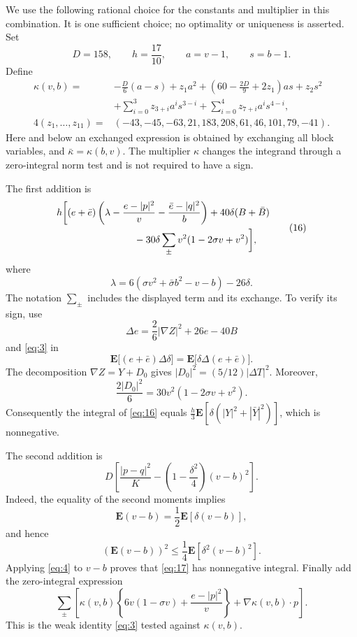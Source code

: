 We use the following rational choice for the constants and
multiplier in this combination. It is one
sufficient choice; no optimality or uniqueness is asserted.
Set
\[
 D=158,\qquad h=\frac{17}{10},\qquad
 a=v-1,\qquad s=b-1.
\]
Define
\begin{equation}
\begin{aligned}
 \kappa(v,b)={}&-\frac D6(a-s)+z_1a^2
       +\left(60-\frac{2D}{9}+2z_1\right)as+z_2s^2\\
 &+\sum_{i=0}^3z_{3+i}a^is^{3-i}
       +\sum_{i=0}^4z_{7+i}a^is^{4-i},\\
 4(z_1,\ldots,z_{11})={}&
       (-43,-45,-63,21,183,208,61,46,101,79,-41).
\end{aligned}
\tag{15}\label{eq:15}
\end{equation}
Here and below an exchanged expression is obtained by exchanging all
block variables, and $\bar\kappa=\kappa(b,v)$.
The multiplier $\kappa$ changes the integrand through a zero-integral
norm test and is not required to have a sign.

The first addition is
\begin{equation}
\begin{aligned}
 h\bigg[&(e+\bar e)
   \left(\lambda-\frac{e-|p|^2}{v}
                     -\frac{\bar e-|q|^2}{b}\right)
       +40\delta(B+\bar B)\\
 &\hspace{24mm}
       -30\delta\sum_{\pm}v^2(1-2\sigma v+v^2)\bigg],
\end{aligned}
\tag{16}\label{eq:16}
\end{equation}
where
\[
 \lambda=6(\sigma v^2+\bar\sigma b^2-v-b)-26\delta.
\]
The notation $\sum_\pm$ includes the displayed term and its exchange.
To verify its sign, use
\[
 \Delta e=\frac{2}{6}|\nabla Z|^2+26e-40B
\]
and \eqref{eq:3} in
\[
 \mathbf E\bigl[(e+\bar e)\Delta\delta\bigr]
 =\mathbf E\bigl[\delta\Delta(e+\bar e)\bigr].
\]
The decomposition $\nabla Z=Y+D_0$ gives
$|D_0|^2=(5/12)|\Delta T|^2$. Moreover,
\[
 \frac{2|D_0|^2}{6}
       =30v^2(1-2\sigma v+v^2).
\]
Consequently the integral of \eqref{eq:16} equals
$\frac h3\mathbf E[\delta(|Y|^2+|\bar Y|^2)]$, which is nonnegative.

The second addition is
\begin{equation}
 D\left[\frac{|p-q|^2}{K}
       -\left(1-\frac{\delta^2}{4}\right)(v-b)^2\right].
\tag{17}\label{eq:17}
\end{equation}
Indeed, the equality of the second moments implies
\[
 \mathbf E(v-b)=\frac12\mathbf E[\delta(v-b)],
\]
and hence
\[
 (\mathbf E(v-b))^2\le\frac14\mathbf E[\delta^2(v-b)^2].
\]
Applying \eqref{eq:4} to $v-b$ proves that \eqref{eq:17} has
nonnegative integral. Finally add the zero-integral expression
\begin{equation}
 \sum_\pm\left[
 \kappa(v,b)\left\{6v(1-\sigma v)+\frac{e-|p|^2}{v}\right\}
       +\nabla\kappa(v,b)\cdot p\right].
\tag{18}\label{eq:18}
\end{equation}
This is the weak identity \eqref{eq:3} tested against $\kappa(v,b)$.

